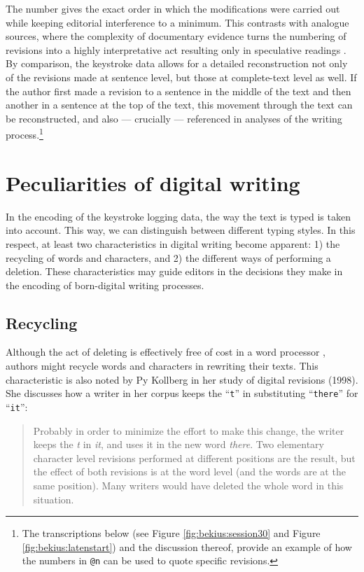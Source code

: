 \begin{paper}
\noindent The number gives the exact order in which the modifications were carried
out while keeping editorial interference to a minimum. This contrasts
with analogue sources, where the complexity of documentary evidence
turns the numbering of revisions into a highly interpretative act
resulting only in speculative readings \citep[90]{dillen_digital_2015}. By comparison,
the keystroke data allows for a detailed reconstruction not only of the
revisions made at sentence level, but those at complete-text level as
well. If the author first made a revision to a sentence in the middle of
the text and then another in a sentence at the top of the text, this
movement through the text can be reconstructed, and also --- crucially ---
referenced in analyses of the writing process.\footnote{The
  transcriptions below (see Figure \ref{fig:bekius:session30} and Figure \ref{fig:bekius:latenstart}) and the discussion
  thereof, provide an example of how the numbers in \lstinline[language=XML]!@n! can be used to
  quote specific revisions.}

\hypertarget{peculiarities-of-digital-writing}{%
\section{Peculiarities of digital
writing}\label{peculiarities-of-digital-writing}}

In the encoding of the keystroke logging data, the way the text is typed
is taken into account. This way, we can distinguish between different typing styles. In this respect, at least two characteristics in digital
writing become apparent: 1) the recycling of words and characters, and
2) the different ways of performing a deletion. These characteristics
may guide editors in the decisions they make in the encoding of
born-digital writing processes.

\subsection{Recycling}\label{recycling}

Although the act of deleting is effectively free of cost in a word processor \citep[256]{sullivan_work_2013}, authors might recycle words and characters in
rewriting their texts. This characteristic is also noted by Py Kollberg
in her study of digital revisions (1998). She discusses how a writer in
her corpus keeps the ``\verb|t|'' in substituting ``\verb|there|'' for ``\verb|it|'':

\begin{quote}
Probably in order to minimize the effort to make this change, the writer
keeps the \emph{t} in \emph{it}, and uses it in the new word
\emph{there}. Two elementary character level revisions performed at
different positions are the result, but the effect of both revisions is
at the word level (and the words are at the same position). Many writers
would have deleted the whole word in this situation. 
\begin{flushright}
\citep[78; emphasis in original]{kollberg_s-notation_1998}
\end{flushright}
\end{quote}


\end{paper}
